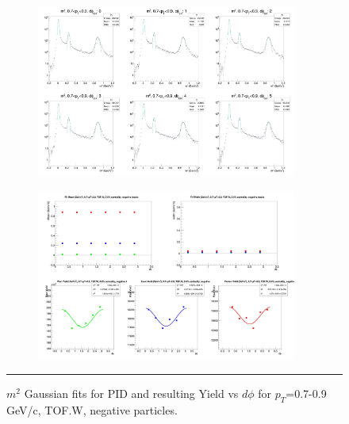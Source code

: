 \begin{figure}[H]
  \centering
    \begin{subfigure}{1\textwidth}
   \centering
   \includegraphics[width=0.94\textwidth]{lowptfits/yieldvsdphi_tof1_cent0_ch0_pT-7-9.jpg}
    \end{subfigure}
    \begin{subfigure}{1\textwidth}
   \centering
   \includegraphics[width=0.94\textwidth]{lowptfits/fitParams_tof1_cent0_ch0_pT-7-9.jpg}
    \end{subfigure}
    \rule{35em}{0.5pt}
  \caption[PID fits and Yield vs $d\phi$ for $p_T$=0.7-0.9 GeV/c, TOF.W, negative particles. ]{$m^2$ Gaussian fits for PID and resulting Yield vs $d\phi$ for $p_T$=0.7-0.9 GeV/c, TOF.W, negative particles.}
  \label{fig:fits7-9neg}
\end{figure}

